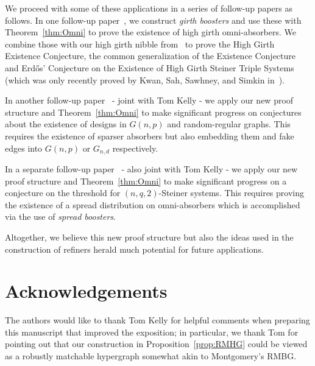 \documentclass[11pt]{article}
\newcounter{i}
\theoremstyle{plain}
\theoremstyle{plain} %
\theoremstyle{definition}
\begin{document}
We proceed with some of these applications in a series of follow-up papers as follows. In one follow-up paper~\cite{DPII}, we construct \emph{girth boosters} and use these with Theorem~\ref{thm:Omni} to prove the existence of high girth omni-absorbers. We combine those with our high girth nibble from~\cite{DP22} to prove the High Girth Existence Conjecture, the common generalization of the Existence Conjecture and Erd\H{o}s' Conjecture on the Existence of High Girth Steiner Triple Systems (which was only recently proved by Kwan, Sah, Sawhney, and Simkin in~\cite{KSSS22}). 

In another follow-up paper~\cite{DKPIII} - joint with Tom Kelly - we apply our new proof structure and Theorem~\ref{thm:Omni} to make significant progress on conjectures about the existence of designs in $G(n,p)$ and random-regular graphs. This requires the existence of sparser absorbers but also embedding them and fake edges into $G(n,p)$ or $G_{n,d}$ respectively.

In a separate follow-up paper~\cite{DKPIV} - also joint with Tom Kelly -  we apply our new proof structure and Theorem~\ref{thm:Omni} to make significant progress on a conjecture on the threshold for $(n,q,2)$-Steiner systems. This requires proving the existence of a spread distribution on omni-absorbers which is accomplished via the use of \emph{spread boosters}.

Altogether, we believe this new proof structure but also the ideas used in the construction of refiners herald much potential for future applications.

\section*{Acknowledgements}

The authors would like to thank Tom Kelly for helpful comments when preparing this manuscript that improved the exposition; in particular, we thank Tom for pointing out that our construction in Proposition~\ref{prop:RMHG} could be viewed as a robustly matchable hypergraph somewhat akin to Montgomery's RMBG. 



\end{document}
